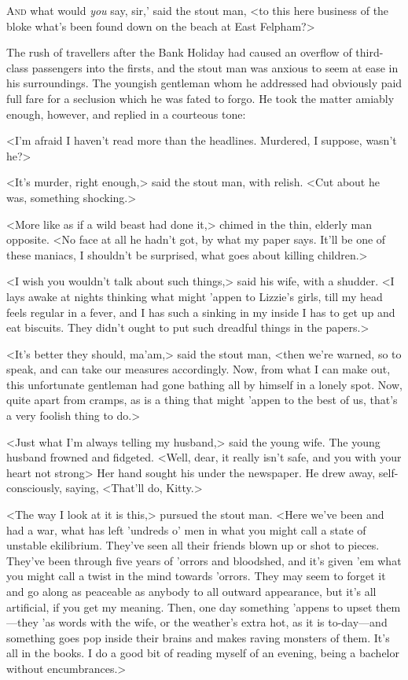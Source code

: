 
\lettrine[lines=4,ante=‘]{A}{nd} what would \textit{you} say, sir,' said the stout man, <to this here business of the bloke what's been found down on the beach at East Felpham?>

\zz
The rush of travellers after the Bank Holiday had caused an overflow of third-class passengers into the firsts, and the stout man was anxious to seem at ease in his surroundings. The youngish gentleman whom he addressed had obviously paid full fare for a seclusion which he was fated to forgo. He took the matter amiably enough, however, and replied in a courteous tone:

<I'm afraid I haven't read more than the headlines. Murdered, I suppose, wasn't he?>

<It's murder, right enough,> said the stout man, with relish. <Cut about he was, something shocking.>

<More like as if a wild beast had done it,> chimed in the thin, elderly man opposite. <No face at all he hadn't got, by what my paper says. It'll be one of these maniacs, I shouldn't be surprised, what goes about killing children.>

<I wish you wouldn't talk about such things,> said his wife, with a shudder. <I lays awake at nights thinking what might 'appen to Lizzie's girls, till my head feels regular in a fever, and I has such a sinking in my inside I has to get up and eat biscuits. They didn't ought to put such dreadful things in the papers.>

<It's better they should, ma'am,> said the stout man, <then we're warned, so to speak, and can take our measures accordingly. Now, from what I can make out, this unfortunate gentleman had gone bathing all by himself in a lonely spot. Now, quite apart from cramps, as is a thing that might 'appen to the best of us, that's a very foolish thing to do.>

<Just what I'm always telling my husband,> said the young wife. The young husband frowned and fidgeted. <Well, dear, it really isn't safe, and you with your heart not strong\longdash> Her hand sought his under the newspaper. He drew away, self-consciously, saying, <That'll do, Kitty.>

<The way I look at it is this,> pursued the stout man. <Here we've been and had a war, what has left 'undreds o' men in what you might call a state of unstable ekilibrium. They've seen all their friends blown up or shot to pieces. They've been through five years of 'orrors and bloodshed, and it's given 'em what you might call a twist in the mind towards 'orrors. They may seem to forget it and go along as peaceable as anybody to all outward appearance, but it's all artificial, if you get my meaning. Then, one day something 'appens to upset them—they 'as words with the wife, or the weather's extra hot, as it is to-day—and something goes pop inside their brains and makes raving monsters of them. It's all in the books. I do a good bit of reading myself of an evening, being a bachelor without encumbrances.>

